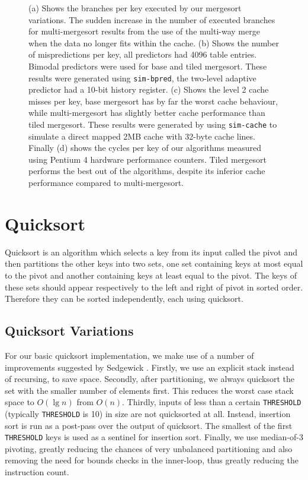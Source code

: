 \documentclass[acmtocl]{acmtrans2m}
\begin{document}
\begin{figure}
\caption{(a) Shows the branches per key executed by our mergesort variations. The sudden increase in the number of executed branches for multi-mergesort
results from the use of the multi-way merge when the data no longer fits within the cache. (b) Shows the number of mispredictions per key, all predictors
had 4096 table entries. Bimodal predictors were used for base and tiled mergesort. These results were generated using \texttt{sim-bpred}, the
two-level adaptive predictor had a 10-bit history register.
(c) Shows the level 2 cache misses per key, base mergesort has by far the worst cache behaviour, while multi-mergesort
has slightly better cache performance than tiled mergesort. These results were generated by using \texttt{sim-cache} to simulate a
direct mapped 2MB cache with 32-byte cache lines. Finally (d) shows the cycles per key of our algorithms measured using Pentium 4 hardware performance
counters. Tiled mergesort performs the best out of the algorithms, despite its inferior cache performance compared to multi-mergesort.}
\label{mergesort_branch_results}
\end{figure}

\section{Quicksort}

Quicksort \cite{Hoare62} is an algorithm which selects a key from its input
called the pivot and then partitions the other keys into two sets,
one set containing keys at most equal to the pivot and another
containing keys at least equal to the pivot. The keys of these sets should
appear respectively to the left and right of pivot in sorted order.
Therefore they can be sorted independently, each using quicksort.

\subsection{Quicksort Variations}

For our basic quicksort implementation, we make use of a number
of improvements suggested by Sedgewick \citeyear{Sedgewick78}. Firstly, we
use an explicit stack instead of recursing, to save space. Secondly, after
partitioning, we always quicksort the set with the smaller number of elements first. 
This reduces the worst case stack space to $O(\lg n)$ from $O(n)$.
Thirdly, inputs of less than a certain \texttt{THRESHOLD} (typically \texttt{THRESHOLD} is 10) in size are not quicksorted
at all. Instead, insertion sort is run as a post-pass over the output of quicksort.
The smallest of the first \texttt{THRESHOLD} keys is used as a sentinel for insertion sort.
Finally, we use median-of-3 pivoting, greatly reducing the chances of very unbalanced
partitioning and also removing the need for bounds checks in the inner-loop, thus
greatly reducing the instruction count.
\end{document}
